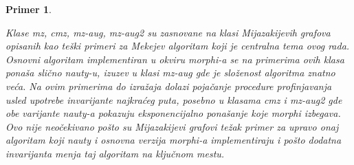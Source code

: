 \documentclass[12pt,oneside]{memoir}
\newtheorem{example}{Primer}
\theoremstyle{definition}
\begin{document}
\begin{example}
\begin{figure}[!h]

	\vspace{10pt}

	\end{figure}

	Klase \emph{mz}, \emph{cmz}, \emph{mz-aug}, \emph{mz-aug2} su zasnovane na
	klasi \emph{Mijazakijevih grafova} opisanih kao teški primeri za Mekejev
	algoritam \cite{Miyazaki} koji je centralna tema ovog rada.  Osnovni
	algoritam implementiran u okviru \emph{morphi}-a se na primerima ovih klasa
	ponaša slično \emph{nauty}-u, izuzev u klasi \emph{mz-aug} gde je složenost
	algoritma znatno veća. Na ovim primerima do izražaja dolazi pojačanje
	procedure profinjavanja usled upotrebe invarijante najkraćeg puta, posebno
	u klasama \emph{cmz} i \emph{mz-aug2} gde obe varijante \emph{nauty}-a
	pokazuju eksponencijalno ponašanje koje \emph{morphi} izbegava. Ovo nije
	neočekivano pošto su Mijazakijevi grafovi težak primer za upravo onaj
	algoritam koji \emph{nauty} i osnovna verzija \emph{morphi}-a
	implementiraju i pošto dodatna invarijanta menja taj algoritam na ključnom
	mestu.

	\begin{figure}[!h]
	\center
\end{figure}
\end{example}
\end{document}
